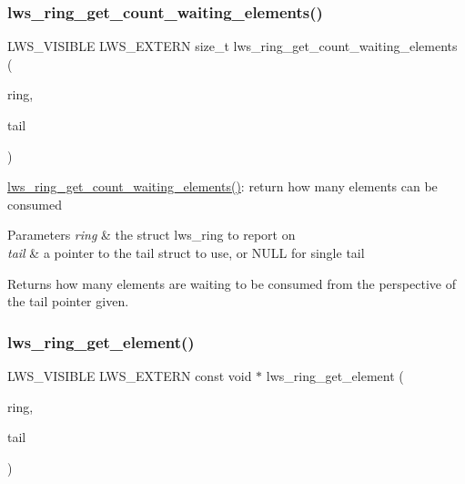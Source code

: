\subsubsection{\texorpdfstring{lws\+\_\+ring\+\_\+get\+\_\+count\+\_\+waiting\+\_\+elements()}{lws\_ring\_get\_count\_waiting\_elements()}}
{\footnotesize\ttfamily L\+W\+S\+\_\+\+V\+I\+S\+I\+B\+LE L\+W\+S\+\_\+\+E\+X\+T\+E\+RN size\+\_\+t lws\+\_\+ring\+\_\+get\+\_\+count\+\_\+waiting\+\_\+elements (\begin{DoxyParamCaption}\item[{struct lws\+\_\+ring $\ast$}]{ring,  }\item[{uint32\+\_\+t $\ast$}]{tail }\end{DoxyParamCaption})}

\hyperlink{group__lws__ring_ga5e3cb460d9af061b5b60dc35d4e2ea95}{lws\+\_\+ring\+\_\+get\+\_\+count\+\_\+waiting\+\_\+elements()}\+: return how many elements can be consumed


\begin{DoxyParams}{Parameters}
{\em ring} & the struct lws\+\_\+ring to report on \\
\hline
{\em tail} & a pointer to the tail struct to use, or N\+U\+LL for single tail\\
\hline
\end{DoxyParams}
Returns how many elements are waiting to be consumed from the perspective of the tail pointer given. \mbox{\label{group__lws__ring_ga4bc75cf61aed9737f54bef9b79b54e58}} 
\subsubsection{\texorpdfstring{lws\+\_\+ring\+\_\+get\+\_\+element()}{lws\_ring\_get\_element()}}
{\footnotesize\ttfamily L\+W\+S\+\_\+\+V\+I\+S\+I\+B\+LE L\+W\+S\+\_\+\+E\+X\+T\+E\+RN const void $\ast$ lws\+\_\+ring\+\_\+get\+\_\+element (\begin{DoxyParamCaption}\item[{struct lws\+\_\+ring $\ast$}]{ring,  }\item[{uint32\+\_\+t $\ast$}]{tail }\end{DoxyParamCaption})}

